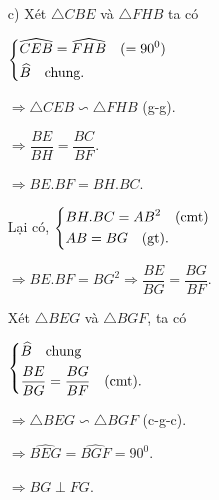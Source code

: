 \begin{ex}
{\begin{enumerate}
        $BC^2=AB^2+AC^2=18^2+24^2=900 \Rightarrow BC=30 $cm.
        
        Ta có $CD$ là phân giác của $\triangle ABC$ $\Rightarrow \dfrac{AD}{AC}=\dfrac{BD}{BC}=\dfrac{AB}{AC+BC}$.
        
        $\Rightarrow \dfrac{AD}{24}=\dfrac{18}{24+30}=\dfrac{1}{3} \Rightarrow AD= 8$cm.
        \item[c)] Xét $\triangle CBE$ và $\triangle FHB$ ta có
        
        $\left\{\begin{aligned}&\widehat{CEB}=\widehat{FHB} \quad(=90^0)\\
        	&\widehat{B}\quad \text{chung.}\end{aligned}\right.$
		
		$\Rightarrow \triangle CEB \backsim \triangle FHB$ (g-g).
		
		$\Rightarrow \dfrac{BE}{BH}=\dfrac{BC}{BF}$.
		
		$\Rightarrow BE.BF=BH.BC$.
		
		Lại có, $\left\{\begin{aligned}&BH.BC=AB^2 \quad \text{(cmt)}\\
		&AB=BG\quad \text{(gt).}\end{aligned}\right.$
		
		$\Rightarrow BE.BF=BG^2 \Rightarrow \dfrac{BE}{BG}=\dfrac{BG}{BF}$.
		
		Xét $\triangle BEG$ và $\triangle BGF$, ta có
		
		$\left\{\begin{aligned}&\widehat{B}\quad \text{chung}\\
		&\dfrac{BE}{BG}=\dfrac{BG}{BF}\quad \text{(cmt).}\end{aligned}\right.$
		
		$\Rightarrow\triangle BEG \backsim \triangle BGF$ (c-g-c).
		
		$\Rightarrow\widehat{BEG}=\widehat{BGF}=90^0$.
		
		$\Rightarrow BG \perp FG$.
    \end{enumerate}
}
\end{ex}
